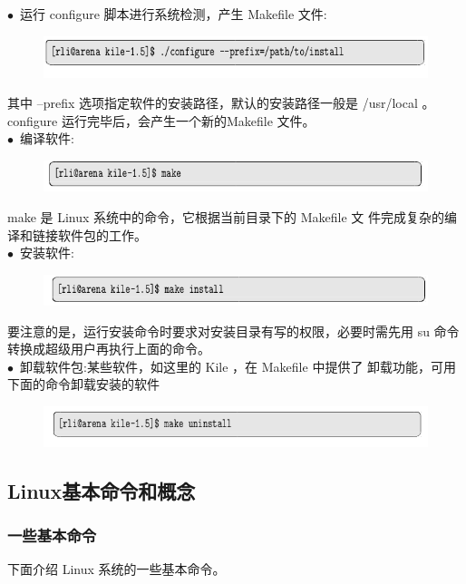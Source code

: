 \documentclass[12pt，a4paper]{article}
\numberwithin{equation}{section}
\begin{document}
$\bullet$~运行 configure 脚本进行系统检测，产生 Makefile 文件:
\begin{figure}[H]
\centering
\includegraphics[scale=0.6]{./figures/211.png}
\end{figure}
其中 --prefix 选项指定软件的安装路径，默认的安装路径一般是 /usr/local 。 configure 运行完毕后，会产生一个新的Makefile 文件。\\
$\bullet$~编译软件:
\begin{figure}[H]
\centering
\includegraphics[scale=0.6]{./figures/212.png}
\end{figure}
make 是 Linux 系统中的命令，它根据当前目录下的 Makefile 文
件完成复杂的编译和链接软件包的工作。\\
$\bullet$~安装软件:
\begin{figure}[H]
\centering
\includegraphics[scale=0.6]{./figures/213.png}
\end{figure}
要注意的是，运行安装命令时要求对安装目录有写的权限，必要时需先用 su 命令转换成超级用户再执行上面的命令。\\
$\bullet$~卸载软件包:某些软件，如这里的 Kile ，在 Makefile 中提供了
卸载功能，可用下面的命令卸载安装的软件
\begin{figure}[H]
\centering
\includegraphics[scale=0.6]{./figures/214.png}
\end{figure}


\subsection{Linux基本命令和概念}
\subsubsection{一些基本命令}
下面介绍 Linux 系统的一些基本命令。
\end{document}
